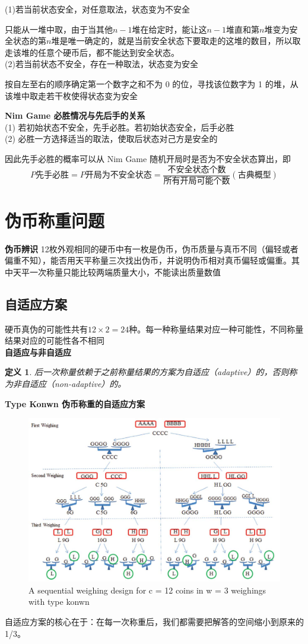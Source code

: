 \documentclass[12pt, a4paper, oneside]{ctexbook}
\newtheorem{definition}[theorem]{定义}
\begin{document}
\noindent(1)若当前状态安全，对任意取法，状态变为不安全

    只能从一堆中取，由于当其他$n-1$堆在给定时，能让这$n-1$堆直和第$n$堆变为安全状态的第$n$堆是唯一确定的，就是当前安全状态下要取走的这堆的数目，所以取走该堆的任意个硬币后，都不能达到安全状态。\\
(2)若当前状态不安全，存在一种取法，状态变为安全

    按自左至右的顺序确定第一个数字之和不为 0 的位，寻找该位数字为 1 的堆，从该堆中取走若干枚使得状态变为安全

\noindent\textbf{Nim Game 必胜情况与先后手的关系}\\
(1) 若初始状态不安全，先手必胜。若初始状态安全，后手必胜\\
(2) 必胜一方选择适当的取法，使取后状态对己方是安全的

因此先手必胜的概率可以从 Nim Game 随机开局时是否为不安全状态算出，即
$$P{\text{先手必胜}} = P{\text{开局为不安全状态}} = \frac{\text{不安全状态个数}}{\text{所有开局可能个数}}(\text{古典概型})$$

\section{伪币称重问题}
\noindent\textbf{伪币辨识}
12枚外观相同的硬币中有一枚是伪币，伪币质量与真币不同（偏轻或者偏重不知），能否用天平称量三次找出伪币，并说明伪币相对真币偏轻或偏重。其中天平一次称量只能比较两端质量大小，不能读出质量数值
\subsection{自适应方案}
硬币真伪的可能性共有$12\times2 = 24$种。每一种称量结果对应一种可能性，不同称量结果对应的可能性各不相同\\
\textbf{自适应与非自适应}
\begin{definition}
后一次称量依赖于之前称量结果的方案为自适应（adaptive）的，否则称为非自适应（non-adaptive）的。\\
\end{definition}
\textbf{Type Konwn 伪币称重的自适应方案}
\begin{figure}[H]
    \centering
    \includegraphics[width = 15cm]{assets/sequential_weighing_design.png}
    \caption{A sequential weighing design for c = 12 coins in w = 3 weighings with type konwn}
\end{figure}
自适应方案的核心在于：在每一次称重后，我们都需要把解答的空间缩小到原来的 1/3。
\end{document}
